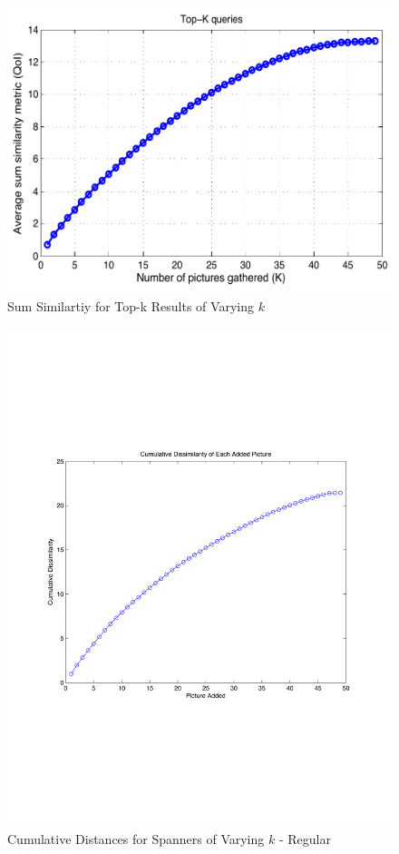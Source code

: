 \begin{figure} 
\begin{centering}
    \includegraphics[scale=0.45]{figures/topkSumSimilarity.pdf}
    \caption{Sum Similartiy for Top-k Results of Varying $k$}
    \label{fig:spanAddDist}
\end{centering}
\end{figure}

\begin{figure} 
\begin{centering}
    \includegraphics[scale=0.35]{figures/spannerCumulativeDist.pdf}
    \caption{Cumulative Distances for Spanners of Varying $k$ - Regular}
    \label{fig:spanCumDistReg}
\end{centering}
\end{figure}


